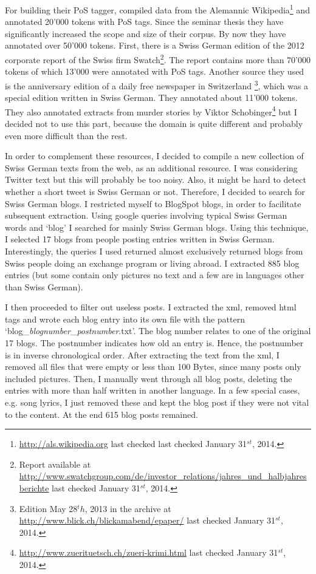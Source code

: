 \documentclass[11pt,letterpaper, covington]{article}
\begin{document}
For building their PoS tagger, \citet{AH12} compiled data from the Alemannic Wikipedia\footnote{\url{http://als.wikipedia.org} last checked last checked January 31$^{st}$, 2014.} and annotated 20'000 tokens with PoS tags. Since the seminar thesis they have significantly increased the scope and size of their corpus. By now they have annotated over 50'000 tokens. First, there is a Swiss German edition of the 2012 corporate report of the Swiss firm Swatch\footnote{Report available at \url{http://www.swatchgroup.com/de/investor_relations/jahres_und_halbjahresberichte} last checked January 31$^{st}$, 2014.}. The report contains more than 70'000 tokens of which 13'000 were annotated with PoS tags. Another source they used is the anniversary edition of a daily free newspaper in Switzerland \footnote{Edition May 28$^th$, 2013 in the archive at \url{http://www.blick.ch/blickamabend/epaper/}  last checked January 31$^{st}$, 2014.}, which was a special edition written in Swiss German. They annotated about 11'000 tokens. They also annotated extracts from murder stories by Viktor Schobinger\footnote{\url{http://www.zuerituetsch.ch/zueri-krimi.html}  last checked January 31$^{st}$, 2014.} but I decided not to use this part, because the domain is quite different and probably even more difficult than the rest. \citep{AH14}

In order to complement these resources, I decided to compile a new collection of Swiss German texts from the web, as an additional resource. I was considering Twitter text but this will probably be too noisy. Also, it might be hard to detect whether a short tweet is Swiss German or not. Therefore, I decided to search for Swiss German blogs. I restricted myself to BlogSpot blogs, in order to facilitate subsequent extraction. Using google queries involving typical Swiss German words and `blog' I searched for mainly Swiss German blogs. Using this technique, I selected 17 blogs from people posting entries written in Swiss German. Interestingly, the queries I used returned almost exclusively returned blogs from Swiss people doing an exchange program or living abroad. I extracted 885 blog entries (but some contain only pictures no text and a few are in languages other than Swiss German). 

I then proceeded to filter out useless posts. I extracted the xml, removed html tags and wrote each blog entry into its own file with the pattern `blog\_\emph{blognumber}\_\emph{postnumber}.txt'. The blog number relates to one of the original 17 blogs. The postnumber indicates how old an entry is. Hence, the postnumber is in inverse chronological order. After extracting the text from the xml, I removed all files that were empty or less than 100 Bytes, since many posts only included pictures. Then, I manually went through all blog posts, deleting the entries with more than half written in another language. In a few special cases, e.g. song lyrics, I just removed these and kept the blog post if they were not vital to the content. At the end 615 blog posts remained.
\end{document}
